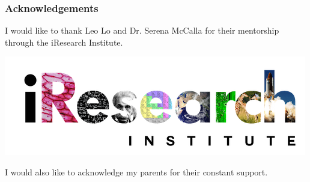 \documentclass[12pt]{beamer}
\begin{document}
\begin{frame}
\frametitle{Acknowledgements}
I would like to thank Leo Lo and Dr. Serena McCalla for their mentorship through the iResearch Institute.

\begin{center}
\includegraphics[scale = 0.58]{iresearch.png}
\end{center}

I would also like to acknowledge my parents for their constant support.
\end{frame}
\end{document}
